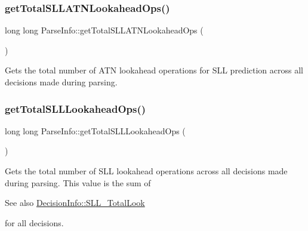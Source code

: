 \subsubsection{\texorpdfstring{get\+Total\+S\+L\+L\+A\+T\+N\+Lookahead\+Ops()}{getTotalSLLATNLookaheadOps()}}
{\footnotesize\ttfamily long long Parse\+Info\+::get\+Total\+S\+L\+L\+A\+T\+N\+Lookahead\+Ops (\begin{DoxyParamCaption}{ }\end{DoxyParamCaption})\hspace{0.3cm}{\ttfamily [virtual]}}



Gets the total number of A\+TN lookahead operations for S\+LL prediction across all decisions made during parsing. 

\mbox{\label{classantlr4_1_1atn_1_1ParseInfo_ab38049ea664df2514084fd24ee7cdc87}} 
\subsubsection{\texorpdfstring{get\+Total\+S\+L\+L\+Lookahead\+Ops()}{getTotalSLLLookaheadOps()}}
{\footnotesize\ttfamily long long Parse\+Info\+::get\+Total\+S\+L\+L\+Lookahead\+Ops (\begin{DoxyParamCaption}{ }\end{DoxyParamCaption})\hspace{0.3cm}{\ttfamily [virtual]}}



Gets the total number of S\+LL lookahead operations across all decisions made during parsing. This value is the sum of \begin{DoxySeeAlso}{See also}
\hyperlink{classantlr4_1_1atn_1_1DecisionInfo_a63d0122173acb50fa288e876220cdb90}{Decision\+Info\+::\+S\+L\+L\+\_\+\+Total\+Look}


\end{DoxySeeAlso}
for all decisions. 

\mbox{\label{classantlr4_1_1atn_1_1ParseInfo_a8aea8e30f374b00aaf60c0f5a5cddd1e}} 
